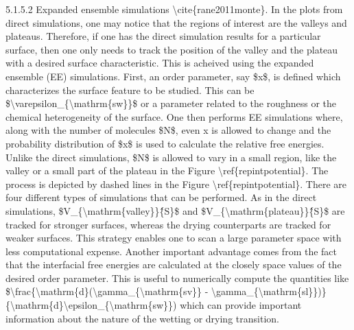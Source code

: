 \par 5.1.5.2 Expanded ensemble simulations \textbackslash cite\{rane2011monte\}. In the plots from direct simulations, one may notice that the regions of interest are the valleys and plateaus. Therefore, if one has the direct simulation results for a particular surface, then one only needs to track the position of the valley and the plateau with a desired surface characteristic. This is acheived using the expanded ensemble (EE) simulations. First, an order parameter, say \$x\$, is defined which characterizes the surface feature to be studied. This can be \$\textbackslash varepsilon\_\{\textbackslash mathrm\{sw\}\}\$ or a parameter related to the roughness or the chemical heterogeneity of the surface. One then performs EE simulations where, along with the number of molecules \$N\$, even x is allowed to change and the probability distribution of \$x\$ is used to calculate the relative free energies. Unlike the direct simulations, \$N\$ is allowed to vary in a small region, like the valley or a small part of the plateau in the Figure \textbackslash ref\{repintpotential\}. The process is depicted by dashed lines in the Figure \textbackslash ref\{repintpotential\}. There are four different types of simulations that can be performed. As in the direct simulations, \$V\_\{\textbackslash mathrm\{valley\}\}\^\{S\}\$ and \$V\_\{\textbackslash mathrm\{plateau\}\}\^\{S\}\$ are tracked for stronger surfaces, whereas the drying counterparts are tracked for weaker surfaces. This strategy enables one to scan a large parameter space with less computational expense. Another important advantage comes from the fact that the interfacial free energies are calculated at the closely space values of the desired order parameter. This is useful to numerically compute the quantities like \$\textbackslash frac\{\textbackslash mathrm\{d\}(\textbackslash gamma\_\{\textbackslash mathrm\{sv\}\} - \textbackslash gamma\_\{\textbackslash mathrm\{sl\}\})\}\{\textbackslash mathrm\{d\}\textbackslash epsilon\_\{\textbackslash mathrm\{sw\}\}) which can provide important information about the nature of the wetting or drying transition.
